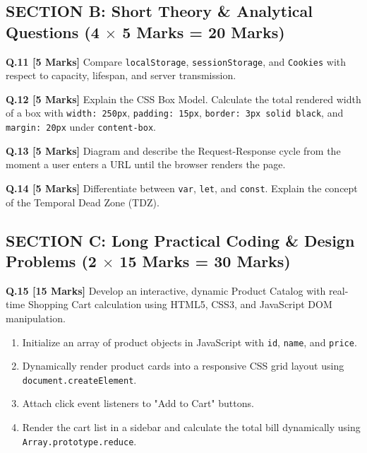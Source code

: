 \vspace{4mm}
\subsection*{SECTION B: Short Theory \& Analytical Questions (4 $\times$ 5 Marks = 20 Marks)}

\noindent\textbf{Q.11 [5 Marks]} Compare \texttt{localStorage}, \texttt{sessionStorage}, and \texttt{Cookies} with respect to capacity, lifespan, and server transmission.

\vspace{2mm}\noindent\textbf{Q.12 [5 Marks]} Explain the CSS Box Model. Calculate the total rendered width of a box with \texttt{width: 250px}, \texttt{padding: 15px}, \texttt{border: 3px solid black}, and \texttt{margin: 20px} under \texttt{content-box}.

\vspace{2mm}\noindent\textbf{Q.13 [5 Marks]} Diagram and describe the Request-Response cycle from the moment a user enters a URL until the browser renders the page.

\vspace{2mm}\noindent\textbf{Q.14 [5 Marks]} Differentiate between \texttt{var}, \texttt{let}, and \texttt{const}. Explain the concept of the Temporal Dead Zone (TDZ).

\vspace{4mm}
\subsection*{SECTION C: Long Practical Coding \& Design Problems (2 $\times$ 15 Marks = 30 Marks)}

\noindent\textbf{Q.15 [15 Marks]} Develop an interactive, dynamic Product Catalog with real-time Shopping Cart calculation using HTML5, CSS3, and JavaScript DOM manipulation.
\begin{enumerate}[label=(\alph*), leftmargin=8mm]
  \item Initialize an array of product objects in JavaScript with \texttt{id}, \texttt{name}, and \texttt{price}.
  \item Dynamically render product cards into a responsive CSS grid layout using \texttt{document.createElement}.
  \item Attach click event listeners to "Add to Cart" buttons.
  \item Render the cart list in a sidebar and calculate the total bill dynamically using \texttt{Array.prototype.reduce}.
\end{enumerate}

